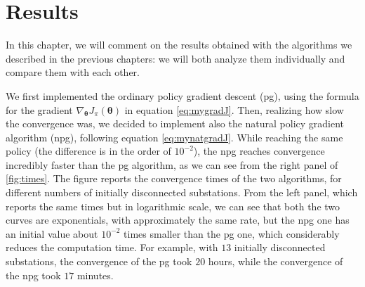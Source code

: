 \chapter{Results}


In this chapter, we will comment on the results obtained with the algorithms we described in the previous chapters: we will both analyze them individually and compare them with each other.



We first implemented the ordinary policy gradient descent (\acrshort{pg}), using the formula for the gradient $\nabla_{\boldsymbol \theta} J_\pi (\boldsymbol \theta)$ in equation \eqref{eq:mygradJ}. Then, realizing how slow the convergence was, we decided to implement also the natural policy gradient algorithm (\acrshort{npg}), following equation \eqref{eq:mynatgradJ}. While reaching the same policy (the difference is in the order of $10^{-2}$), the \acrshort{npg} reaches convergence incredibly faster than the \acrshort{pg} algorithm, as we can see from the right panel of \autoref{fig:times}. The figure reports the convergence times of the two algorithms, for different numbers of initially disconnected substations. From the left panel, which reports the same times but in logarithmic scale, we can see that both the two curves are exponentials, with approximately the same rate, but the \acrshort{npg} one has an initial value about $10^{-2}$ times smaller than the \acrshort{pg} one, which considerably reduces the computation time. For example, with $13$ initially disconnected substations, the convergence of the \acrshort{pg} took $20$ hours, while the convergence of the \acrshort{npg} took $17$ minutes.

